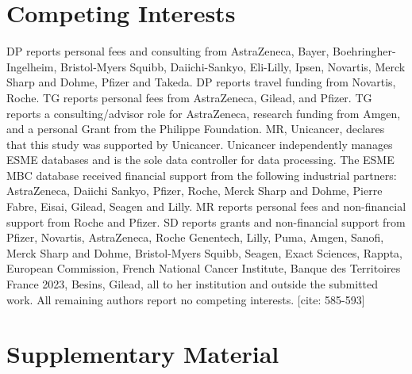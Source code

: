 \documentclass[a4paper,10pt]{article}
\begin{document}
\section{Competing Interests}
DP reports personal fees and consulting from AstraZeneca, Bayer, Boehringher-Ingelheim, Bristol-Myers Squibb, Daiichi-Sankyo, Eli-Lilly, Ipsen, Novartis, Merck Sharp and Dohme, Pfizer and Takeda. DP reports travel funding from Novartis, Roche. TG reports personal fees from AstraZeneca, Gilead, and Pfizer. TG reports a consulting/advisor role for AstraZeneca, research funding from Amgen, and a personal Grant from the Philippe Foundation. MR, Unicancer, declares that this study was supported by Unicancer. Unicancer independently manages ESME databases and is the sole data controller for data processing. The ESME MBC database received financial support from the following industrial partners: AstraZeneca, Daiichi Sankyo, Pfizer, Roche, Merck Sharp and Dohme, Pierre Fabre, Eisai, Gilead, Seagen and Lilly. MR reports personal fees and non-financial support from Roche and Pfizer. SD reports grants and non-financial support from Pfizer, Novartis, AstraZeneca, Roche Genentech, Lilly, Puma, Amgen, Sanofi, Merck Sharp and Dohme, Bristol-Myers Squibb, Seagen, Exact Sciences, Rappta, European Commission, French National Cancer Institute, Banque des Territoires France 2023, Besins, Gilead, all to her institution and outside the submitted work. All remaining authors report no competing interests. [cite: 585-593]



\section{Supplementary Material}
\end{document}
